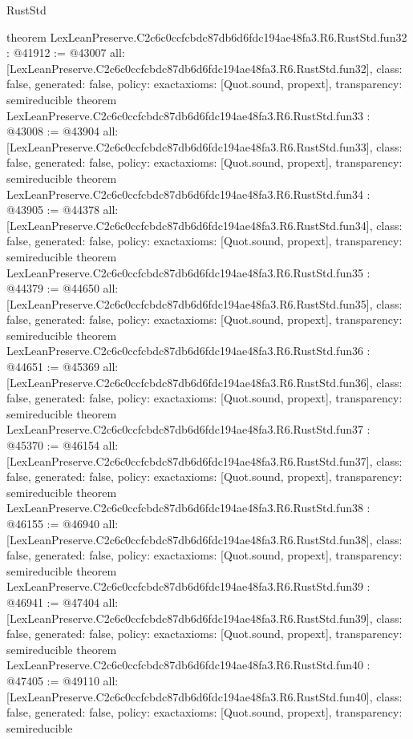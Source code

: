 \begin{lexlean}{RustStd}
\begin{coremodule}
{}
theorem LexLeanPreserve.C2c6c0ccfcbdc87db6d6fdc194ae48fa3.R6.RustStd.fun32 : @41912 := @43007 {
  all: [LexLeanPreserve.C2c6c0ccfcbdc87db6d6fdc194ae48fa3.R6.RustStd.fun32],
  class: false,
  generated: false,
  policy: exact{axioms: [Quot.sound, propext]},
  transparency: semireducible
}
theorem LexLeanPreserve.C2c6c0ccfcbdc87db6d6fdc194ae48fa3.R6.RustStd.fun33 : @43008 := @43904 {
  all: [LexLeanPreserve.C2c6c0ccfcbdc87db6d6fdc194ae48fa3.R6.RustStd.fun33],
  class: false,
  generated: false,
  policy: exact{axioms: [Quot.sound, propext]},
  transparency: semireducible
}
theorem LexLeanPreserve.C2c6c0ccfcbdc87db6d6fdc194ae48fa3.R6.RustStd.fun34 : @43905 := @44378 {
  all: [LexLeanPreserve.C2c6c0ccfcbdc87db6d6fdc194ae48fa3.R6.RustStd.fun34],
  class: false,
  generated: false,
  policy: exact{axioms: [Quot.sound, propext]},
  transparency: semireducible
}
theorem LexLeanPreserve.C2c6c0ccfcbdc87db6d6fdc194ae48fa3.R6.RustStd.fun35 : @44379 := @44650 {
  all: [LexLeanPreserve.C2c6c0ccfcbdc87db6d6fdc194ae48fa3.R6.RustStd.fun35],
  class: false,
  generated: false,
  policy: exact{axioms: [Quot.sound, propext]},
  transparency: semireducible
}
theorem LexLeanPreserve.C2c6c0ccfcbdc87db6d6fdc194ae48fa3.R6.RustStd.fun36 : @44651 := @45369 {
  all: [LexLeanPreserve.C2c6c0ccfcbdc87db6d6fdc194ae48fa3.R6.RustStd.fun36],
  class: false,
  generated: false,
  policy: exact{axioms: [Quot.sound, propext]},
  transparency: semireducible
}
theorem LexLeanPreserve.C2c6c0ccfcbdc87db6d6fdc194ae48fa3.R6.RustStd.fun37 : @45370 := @46154 {
  all: [LexLeanPreserve.C2c6c0ccfcbdc87db6d6fdc194ae48fa3.R6.RustStd.fun37],
  class: false,
  generated: false,
  policy: exact{axioms: [Quot.sound, propext]},
  transparency: semireducible
}
theorem LexLeanPreserve.C2c6c0ccfcbdc87db6d6fdc194ae48fa3.R6.RustStd.fun38 : @46155 := @46940 {
  all: [LexLeanPreserve.C2c6c0ccfcbdc87db6d6fdc194ae48fa3.R6.RustStd.fun38],
  class: false,
  generated: false,
  policy: exact{axioms: [Quot.sound, propext]},
  transparency: semireducible
}
theorem LexLeanPreserve.C2c6c0ccfcbdc87db6d6fdc194ae48fa3.R6.RustStd.fun39 : @46941 := @47404 {
  all: [LexLeanPreserve.C2c6c0ccfcbdc87db6d6fdc194ae48fa3.R6.RustStd.fun39],
  class: false,
  generated: false,
  policy: exact{axioms: [Quot.sound, propext]},
  transparency: semireducible
}
theorem LexLeanPreserve.C2c6c0ccfcbdc87db6d6fdc194ae48fa3.R6.RustStd.fun40 : @47405 := @49110 {
  all: [LexLeanPreserve.C2c6c0ccfcbdc87db6d6fdc194ae48fa3.R6.RustStd.fun40],
  class: false,
  generated: false,
  policy: exact{axioms: [Quot.sound, propext]},
  transparency: semireducible
}
\end{coremodule}
\end{lexlean}
